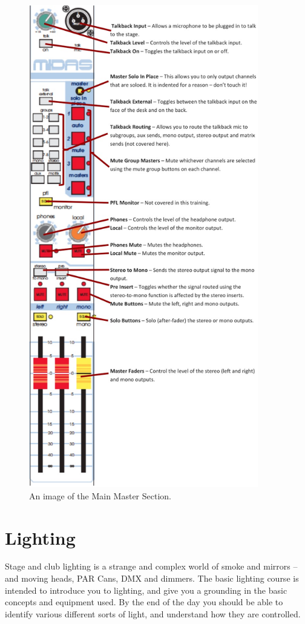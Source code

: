 \documentclass[14pt]{article} %
\begin{document}
\begin{figure}[H]
\begin{center}

\includegraphics[width=10cm]{master-section.jpg}
\caption{An image of the Main Master Section.}
\label{fig:master-section}

\end{center}
\end{figure}


\section{Lighting}
\label{lighting}
Stage and club lighting is a strange and complex world of smoke and mirrors – and moving heads, PAR Cans, DMX and dimmers. The basic lighting course is intended to introduce you to lighting, and give you a grounding in the basic concepts and equipment used. By the end of the day you should be able to identify various different sorts of light, and understand how they are controlled.
\end{document}
